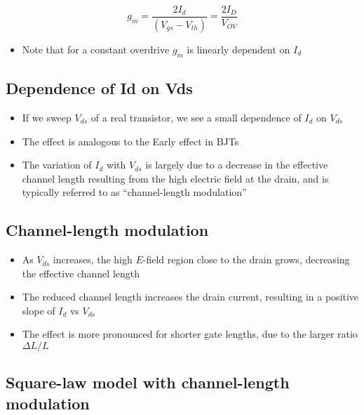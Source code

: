 \documentclass[11pt]{article}
\providecommand{\tightlist}{%
      \setlength{\itemsep}{0pt}\setlength{\parskip}{0pt}}
\begin{document}
\begin{equation}
g_m = \dfrac{2I_d}{(V_{gs} - V_{th})} = \dfrac{2I_D}{V_{OV}}
\end{equation}

\begin{itemize}
\tightlist
\item
  Note that for a constant overdrive \(g_m\) is linearly dependent on
  \(I_d\)
\end{itemize}

    \hypertarget{dependence-of-id-on-vds}{%
\subsection{Dependence of Id on Vds}\label{dependence-of-id-on-vds}}

    

    \begin{itemize}
\tightlist
\item
  If we sweep \(V_{ds}\) of a real transistor, we see a small dependence
  of \(I_d\) on \(V_{ds}\)
\item
  The effect is analogous to the Early effect in BJTs
\item
  The variation of \(I_d\) with \(V_{ds}\) is largely due to a decrease
  in the effective channel length resulting from the high electric field
  at the drain, and is typically referred to as ``channel-length
  modulation''
\end{itemize}

    \hypertarget{channel-length-modulation}{%
\subsection{Channel-length modulation}\label{channel-length-modulation}}

    

    \begin{itemize}
\tightlist
\item
  As \(V_{ds}\) increases, the high \(E\)-field region close to the
  drain grows, decreasing the effective channel length
\item
  The reduced channel length increases the drain current, resulting in a
  positive slope of \(I_d\) vs \(V_{ds}\)\\
\item
  The effect is more pronounced for shorter gate lengths, due to the
  larger ratio \(\Delta L / L\)
\end{itemize}

    \hypertarget{square-law-model-with-channel-length-modulation}{%
\subsection{Square-law model with channel-length
modulation}\label{square-law-model-with-channel-length-modulation}}
\end{document}
